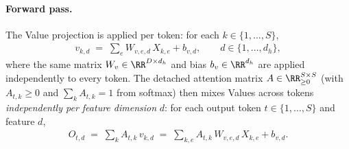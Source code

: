 \paragraph{Forward pass.} The Value projection is applied per token: for each $k \in \{1,\dots,S\}$,
\begin{align}\label{ptnb:eq:attn-V-forward}
    v_{k,d} \;=\; \sum_e W_{v,e,d}\, X_{k,e} + b_{v,d},
    \qquad d \in \{1,\dots,d_h\},
\end{align}
where the same matrix $W_v \in \RR^{D \times d_h}$ and bias $b_v \in \RR^{d_h}$ are applied
independently to every token. The detached attention matrix $A \in \RR^{S \times S}_{\ge 0}$ (with
$A_{t,k} \ge 0$ and $\sum_k A_{t,k} = 1$ from softmax) then mixes Values across tokens
\emph{independently per feature dimension} $d$: for each output token $t \in \{1,\dots,S\}$ and
feature $d$,
\begin{align}\label{ptnb:eq:attn-AV-forward}
    O_{t,d} \;=\; \sum_k A_{t,k}\, v_{k,d}
    \;=\; \sum_{k,e} A_{t,k}\, W_{v,e,d}\, X_{k,e} + b_{v,d}.
\end{align}

